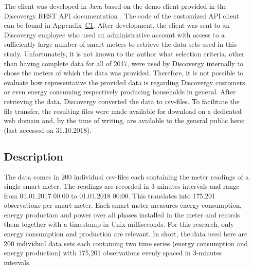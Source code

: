 The client was developed in Java based on the demo client provided in the Discovergy REST API documentation \citep{DiscovergyAPI:2018}. The code of the customized API client can be found in Appendix~\hyperlink{AppC1:Code:API}{C1}. After development, the client was sent to an Discovergy employee who used an administrative account with access to a sufficiently large number of smart meters to retrieve the data sets used in this study. Unfortunately, it is not known to the author what selection criteria, other than having complete data for all of 2017, were used by Discovergy internally to chose the meters of which the data was provided. Therefore, it is not possible to evaluate how representative the provided data is regarding Discovergy customers or even energy consuming respectively producing households in general. After retrieving the data, Discovergy converted the data to csv-files. To facilitate the file transfer, the resulting files were made available for download on a dedicated web domain and, by the time of writing, are available to the general public here:  (last accessed on 31.10.2018). 




\subsection{Description}\label{Sec:Data;Subsec:Description}

The data comes in 200 individual csv-files each containing the meter readings of a single smart meter. The readings are recorded in 3-minutes intervals and range from 01.01.2017 00:00 to 01.01.2018 00:00. This translates into 175,201 observations per smart meter. Each smart meter measures energy consumption, energy production and power over all phases installed in the meter and records them together with a timestamp in Unix milliseconds. For this research, only energy consumption and production are relevant. In short, the data used here are 200 individual data sets each containing two time series (energy consumption and energy production) with 175,201 observations evenly spaced in 3-minutes intervals.

